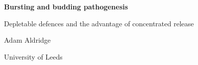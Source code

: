 \documentclass[11pt,a4paper]{report}
\begin{document}
\hypersetup{pageanchor=false}
\begin{titlepage}
\centering
\vspace*{4cm}
{\LARGE\bfseries Bursting and budding pathogenesis\par}
\vspace{6pt}
{\large Depletable defences and the advantage of concentrated release\par}
\vspace{2.5cm}
{\large Adam Aldridge\par}
\vspace{4pt}
{University of Leeds\par}
\end{titlepage}
\hypersetup{pageanchor=true}

\tableofcontents
\clearpage



\FloatBarrier
\begingroup
\footnotesize
\makeatletter
\renewcommand\@openbib@code{\setlength{\itemsep}{0pt}\setlength{\parsep}{0pt}}
\makeatother


\endgroup
\end{document}
